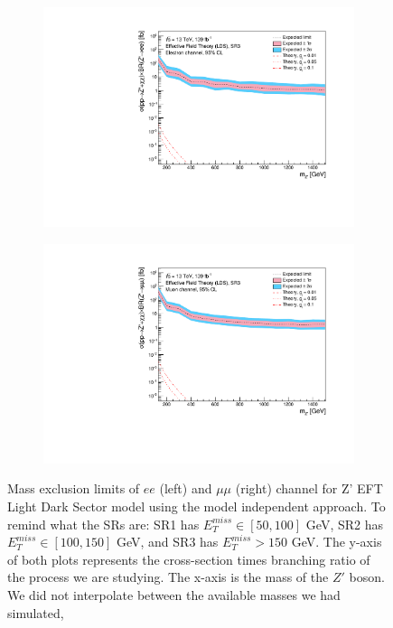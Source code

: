 \documentclass[12pt, a4paper]{book}
\begin{document}
\begin{figure}[!ht]
\begin{subfigure}[b]{0.49\textwidth}
      \includegraphics[width=1\textwidth]{Limits/Model_independent/150/EFT_LDS/mass_exclusion_ee.pdf}
   \end{subfigure}
   \hfill
   \begin{subfigure}[b]{0.49\textwidth}
      \centering
      \includegraphics[width=1\textwidth]{Limits/Model_independent/150/EFT_LDS/mass_exclusion_uu.pdf}
   \end{subfigure}
   \caption[Expected mass exclusion limits results for EFT LDS model on $ee$ and $\mu\mu$ channel using the model independent approach]{Mass exclusion limits of $ee$ (left) and $\mu\mu$ (right) channel for Z' EFT Light Dark Sector model using the model independent approach. To remind what the SRs are: SR1 has $E_T^{miss}\in[50, 100]$ GeV, SR2 has $E_T^{miss}\in[100, 150]$ GeV, and SR3 has $E_T^{miss}>150$ GeV. The y-axis of both plots represents the cross-section times branching ratio of the process we are studying. The x-axis is the mass of the $Z'$ boson. We did not interpolate between the available masses we had simulated, 
}
\end{figure}
\end{document}
